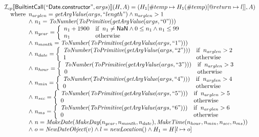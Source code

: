 \[\begin{array}{l}
\mathcal{I} _{cp}\llbracket \mbox{\textsf{BuiltintCall}}(``\mbox{\textsf{Date.constructor}}",args)\rrbracket(H,A)
  = (H_1[\#temp \mapsto H_1(\#temp)[@return \mapsto l]], A)\\
\quad{\rm where}\begin{array}[t]{l}
  n_{arglen} = \emph{getArgValue}(args, ``length") \land n_{arglen} > 1\\
  \land\ n_{1} = \emph{ToNumber}(\emph{ToPrimitive}(\emph{getArgValue}(args, ``0")))\\
  \land\ n_{year} = \left\{\begin{array}{ll}
    n_{1} + 1900
    & {\rm if}\begin{array}[t]{l}n_1 \neq \mbox{\textsf{NaN}} \land 0 \leq n_1 \land n_1 \leq 99\end{array}\\
    n_{1} & {\rm otherwise}
    \end{array}\right.\\
  \land\ n_{month} =  \emph{ToNumber}(\emph{ToPrimitive}(\emph{getArgValue}(args, ``1")))\\
  \land\ n_{date} = \left\{\begin{array}{ll}
    \emph{ToNumber}(\emph{ToPrimitive}(\emph{getArgValue}(args, ``2"))) & {\rm if}\begin{array}[t]{l}n_{arglen} > 2\end{array}\\
    1 & {\rm otherwise}
    \end{array}\right.\\
  \land\ n_{hour} = \left\{\begin{array}{ll}
    \emph{ToNumber}(\emph{ToPrimitive}(\emph{getArgValue}(args, ``3"))) & {\rm if}\begin{array}[t]{l}n_{arglen} > 3\end{array}\\
    0 & {\rm otherwise}
    \end{array}\right.\\
  \land\ n_{min} = \left\{\begin{array}{ll}
    \emph{ToNumber}(\emph{ToPrimitive}(\emph{getArgValue}(args, ``4"))) & {\rm if}\begin{array}[t]{l}n_{arglen} > 4\end{array}\\
    0 & {\rm otherwise}
    \end{array}\right.\\
  \land\ n_{sec} = \left\{\begin{array}{ll}
    \emph{ToNumber}(\emph{ToPrimitive}(\emph{getArgValue}(args, ``5"))) & {\rm if}\begin{array}[t]{l}n_{arglen} > 5\end{array}\\
    0 & {\rm otherwise}
    \end{array}\right.\\
  \land\ n_{ms} = \left\{\begin{array}{ll}
    \emph{ToNumber}(\emph{ToPrimitive}(\emph{getArgValue}(args, ``6"))) & {\rm if}\begin{array}[t]{l}n_{arglen} > 6\end{array}\\
    0 & {\rm otherwise}
    \end{array}\right.\\
  \land\ n = \emph{MakeDate}(\emph{MakeDay}(n_{year}, n_{month}, n_{date}),
    \emph{MakeTime}(n_{hour}, n_{min}, n_{sec},n_{ms}))\\
  \land\ o = \emph{NewDateObject}(v) \land l = \emph{newLocation}() \land H_1 = H[l \mapsto o]
  \end{array}\\
\\\\


\end{array}\]
